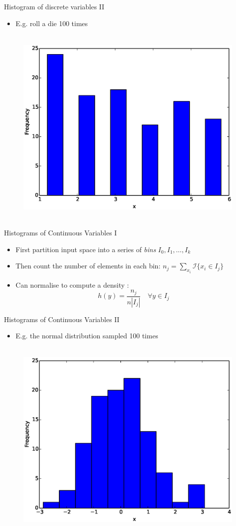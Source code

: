 \documentclass{beamer}
\begin{document}
\begin{frame}{Histogram of discrete variables II}
\begin{itemize}
 \item E.g. roll a die 100 times 
\end{itemize}
\begin{figure}[htp]
\mbox{
\includegraphics[width=0.5\linewidth]{DiscreteHist.eps}
}
\end{figure}
\end{frame}

\begin{frame}{Histograms of Continuous Variables I}  
 \begin{itemize} 
  \item First partition input space into a series of \emph{bins} $I_0, I_1, \ldots, I_k$ 
  \item Then count the number of elements in each bin: $n_j = \sum_{x_i} \mathcal{I}\{x_i \in I_j\}$
  \item Can normalise to compute a density : 
  \begin{displaymath} 
    h(y) = \frac{n_j}{n |I_j|} \quad \forall y \in I_j
  \end{displaymath}
 \end{itemize}
\end{frame}

\begin{frame}{Histograms of Continuous Variables II}  
\begin{itemize}
 \item E.g. the normal distribution sampled 100 times 
\end{itemize}
\begin{figure}[htp]
\mbox{
\includegraphics[width=0.5\linewidth]{ContinuousHist.eps}
}
\end{figure} 
\end{frame}
\end{document}
